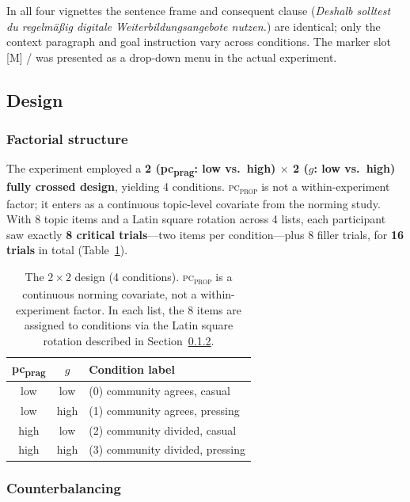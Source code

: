 \documentclass[12pt]{article}
\begin{document}
\noindent In all four vignettes the sentence frame and consequent clause
(\textit{Deshalb solltest du regelm\"a\ss{}ig digitale
Weiterbildungsangebote nutzen.}) are identical; only the context
paragraph and goal instruction vary across conditions.
The marker slot [M] / \underline{\hspace{2.2cm}} was presented as a
drop-down menu in the actual experiment.

\subsection{Design}

\subsubsection{Factorial structure}

The experiment employed a \textbf{2 (pc\textsubscript{prag}: low vs.\ high)
$\times$ 2 ($g$: low vs.\ high) fully crossed design},
yielding 4 conditions.
\textsc{pc\textsubscript{prop}} is not a within-experiment factor; it enters
as a continuous topic-level covariate from the norming study.
With 8 topic items and a Latin square rotation across 4 lists, each
participant saw exactly \textbf{8 critical trials}---two items per condition---plus
8 filler trials, for \textbf{16 trials} in total
(Table~\ref{tab:design}).

\begin{table}[ht]
\centering
\caption{%
  The $2\times2$ design (4 conditions).
  \textsc{pc\textsubscript{prop}} is a continuous norming covariate, not a
  within-experiment factor.
  In each list, the 8 items are assigned to conditions via the Latin square
  rotation described in Section~\ref{subsub:counterbalancing}.}
\label{tab:design}
\small
\begin{tabular}{ccl}
\toprule
\textbf{pc\textsubscript{prag}} &
\textbf{$g$} &
\textbf{Condition label} \\
\midrule
low  & low  & (0) community agrees, casual \\
low  & high & (1) community agrees, pressing \\
high & low  & (2) community divided, casual \\
high & high & (3) community divided, pressing \\
\bottomrule
\end{tabular}
\end{table}

\subsubsection{Counterbalancing}
\label{subsub:counterbalancing}
\end{document}
